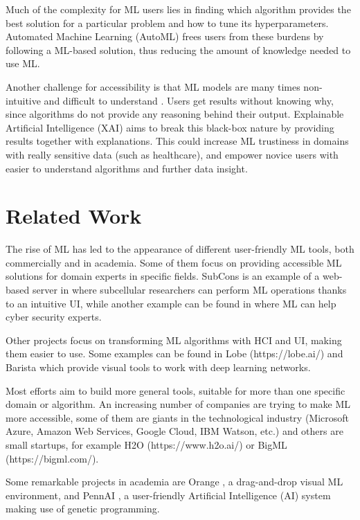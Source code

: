 \documentclass[runningheads]{llncs}
\begin{document}
	Much of the complexity for ML users lies in finding which algorithm provides the best solution for a
	particular problem and how to tune its hyperparameters. Automated Machine Learning (AutoML) frees users
	from these burdens \cite{automl} by following a ML-based solution, thus reducing the amount of knowledge needed to use ML.
	
	Another challenge for accessibility is that ML models are many times non-intuitive and difficult to understand \cite{xai}. Users get results without knowing why, since algorithms do not provide
	any reasoning behind their output. Explainable Artificial Intelligence (XAI) aims to break this
	black-box nature by providing results together with explanations. This could increase ML trustiness in domains with really sensitive data (such as healthcare), and empower novice users with easier to understand algorithms and further data insight.
	
	\section{Related Work}
	
	The rise of ML has led to the appearance of different user-friendly ML tools, both commercially and in
	academia. Some of them focus on providing accessible ML solutions for domain experts in
	specific fields. SubCons \cite{subcons} is an example of a web-based server in where subcellular
	researchers can perform ML operations thanks to an intuitive UI, while another example can be found
	in \cite{cyber} where ML can help cyber security experts.
	
	Other projects focus on transforming ML algorithms with HCI and UI, making them easier to use. Some examples can be found in Lobe (https://lobe.ai/) and Barista \cite{Barista} which provide visual tools to work with deep learning networks.
	
	Most efforts aim to build more general tools, suitable for more than one specific domain or algorithm.
	An increasing number of companies are trying to make ML more accessible, some of them are giants in the
	technological industry (Microsoft Azure, Amazon Web Services, Google Cloud, IBM Watson, etc.) and
	others are small startups, for example H2O (https://www.h2o.ai/) or BigML (https://bigml.com/).
	
	Some remarkable projects in academia are Orange \cite{orange}, a drag-and-drop visual ML environment,
	and PennAI \cite{pennAI}, a user-friendly Artificial Intelligence (AI) system making use of genetic
	programming.
	
\end{document}
